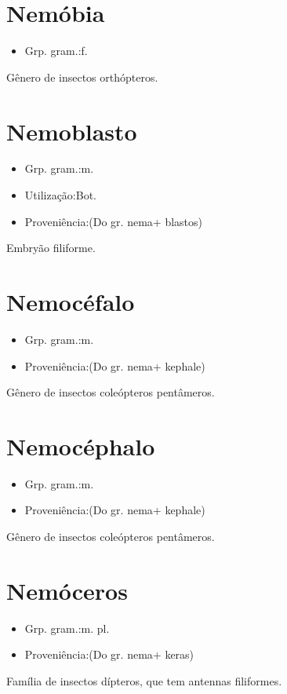\section{Nemóbia}
\begin{itemize}
\item {Grp. gram.:f.}
\end{itemize}
Gênero de insectos orthópteros.
\section{Nemoblasto}
\begin{itemize}
\item {Grp. gram.:m.}
\end{itemize}
\begin{itemize}
\item {Utilização:Bot.}
\end{itemize}
\begin{itemize}
\item {Proveniência:(Do gr. \textunderscore nema\textunderscore  + \textunderscore blastos\textunderscore )}
\end{itemize}
Embryão filiforme.
\section{Nemocéfalo}
\begin{itemize}
\item {Grp. gram.:m.}
\end{itemize}
\begin{itemize}
\item {Proveniência:(Do gr. \textunderscore nema\textunderscore  + \textunderscore kephale\textunderscore )}
\end{itemize}
Gênero de insectos coleópteros pentâmeros.
\section{Nemocéphalo}
\begin{itemize}
\item {Grp. gram.:m.}
\end{itemize}
\begin{itemize}
\item {Proveniência:(Do gr. \textunderscore nema\textunderscore  + \textunderscore kephale\textunderscore )}
\end{itemize}
Gênero de insectos coleópteros pentâmeros.
\section{Nemóceros}
\begin{itemize}
\item {Grp. gram.:m. pl.}
\end{itemize}
\begin{itemize}
\item {Proveniência:(Do gr. \textunderscore nema\textunderscore  + \textunderscore keras\textunderscore )}
\end{itemize}
Família de insectos dípteros, que tem antennas filiformes.
